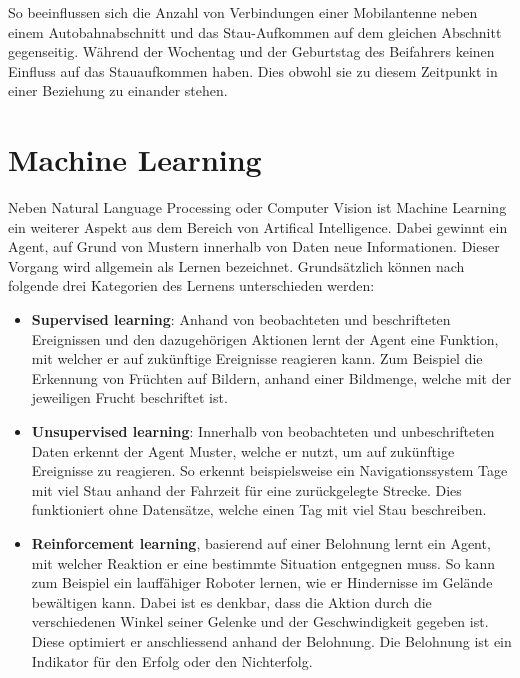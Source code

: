 So beeinflussen sich die Anzahl von Verbindungen einer Mobilantenne neben einem Autobahnabschnitt und das Stau-Aufkommen auf dem gleichen Abschnitt gegenseitig. Während der Wochentag und der Geburtstag des Beifahrers keinen Einfluss auf das Stauaufkommen haben. Dies obwohl sie zu diesem Zeitpunkt in einer Beziehung zu einander stehen.


\section{\gls{Machine Learning}}



Neben \gls{Natural Language Processing} oder \gls{Computer Vision} ist \gls{Machine Learning} ein weiterer Aspekt aus dem Bereich von \gls{Artifical Intelligence}. Dabei gewinnt ein Agent, auf Grund von Mustern innerhalb von Daten neue Informationen. Dieser Vorgang wird allgemein als Lernen bezeichnet. Grundsätzlich können nach \cite{Russell:2009:AIM:1671238} folgende drei Kategorien des Lernens unterschieden werden:

\begin{itemize}
    \item \textbf{Supervised learning}: Anhand von beobachteten und beschrifteten Ereignissen und den dazugehörigen Aktionen lernt der Agent eine Funktion, mit welcher er auf zukünftige Ereignisse reagieren kann. Zum Beispiel die Erkennung von Früchten auf Bildern, anhand einer Bildmenge, welche mit der jeweiligen Frucht beschriftet ist.
    \item \textbf{Unsupervised learning}: Innerhalb von beobachteten und unbeschrifteten Daten erkennt der Agent Muster, welche er nutzt, um auf zukünftige Ereignisse zu reagieren. So erkennt beispielsweise ein Navigationssystem Tage mit viel Stau anhand der Fahrzeit für eine zurückgelegte Strecke. Dies funktioniert ohne Datensätze, welche einen Tag mit viel Stau beschreiben.
    \item \textbf{Reinforcement learning}, basierend auf einer Belohnung lernt ein Agent, mit welcher Reaktion er eine bestimmte Situation entgegnen muss. So kann zum Beispiel ein lauffähiger Roboter lernen, wie er Hindernisse im Gelände bewältigen kann. Dabei ist es denkbar, dass die Aktion durch die verschiedenen Winkel seiner Gelenke und der Geschwindigkeit gegeben ist. Diese optimiert er anschliessend anhand der Belohnung. Die Belohnung ist ein Indikator für den Erfolg oder den Nichterfolg.
\end{itemize}

